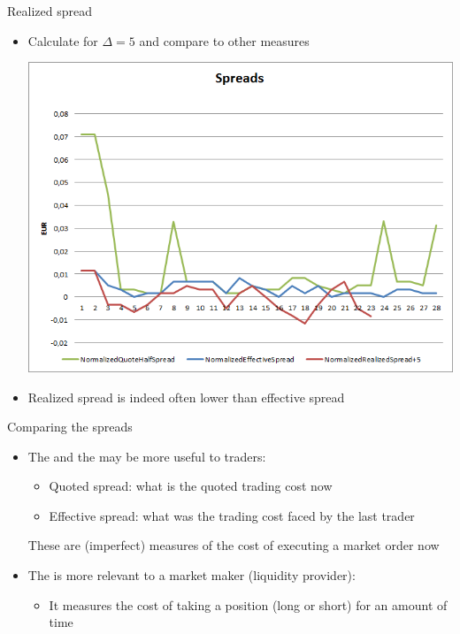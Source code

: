 \documentclass[english,10pt]{beamer}
\begin{document}
\begin{frame}{Realized spread}
	\begin{itemize}
		\item Calculate for $\Delta=5$ and compare to other measures
		\begin{center}
			\includegraphics[scale=0.39]{pics/L2_realizedspread}
		\end{center}
		\item Realized spread is indeed often lower than effective spread
	\end{itemize}
\end{frame}


\begin{frame}{Comparing the spreads}
	\begin{itemize}
		\item The  and the  may be more useful to traders:
		\begin{itemize}
			\item Quoted spread: what is the quoted trading cost now 
			\item Effective spread: what was the trading cost faced by the last trader
		\end{itemize}
		These are (imperfect) measures of the cost of executing a market order now
		\item The  is more relevant to a market maker (liquidity provider):
		\begin{itemize}
			\item It measures the cost of taking a position (long or short) for an amount of time
		\end{itemize}
	\end{itemize}
\end{frame}
\end{document}
